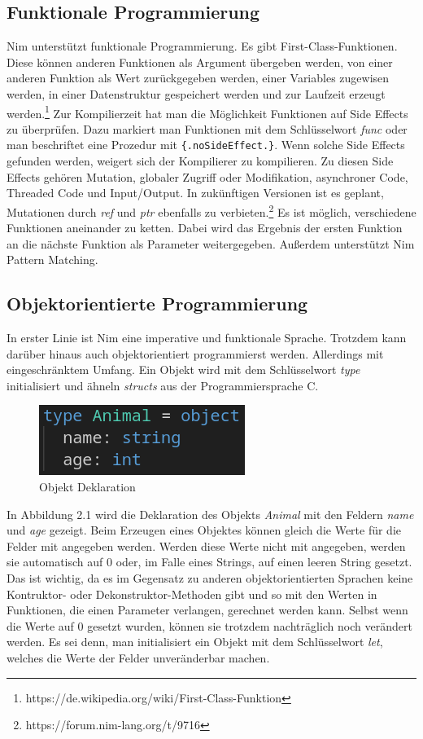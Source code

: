 \documentclass[11pt]{report}
\begin{document}
\subsection{Funktionale Programmierung}
Nim unterstützt funktionale Programmierung. Es gibt First-Class-Funktionen. Diese können anderen Funktionen als Argument übergeben werden, von einer anderen Funktion als Wert zurückgegeben werden, einer Variables zugewisen werden, in einer Datenstruktur gespeichert werden und zur Laufzeit erzeugt werden.\footnote{https://de.wikipedia.org/wiki/First-Class-Funktion}
\newline
Zur Kompilierzeit hat man die Möglichkeit Funktionen auf Side Effects zu überprüfen. Dazu markiert man Funktionen mit dem Schlüsselwort \emph{func} oder man beschriftet eine Prozedur mit \verb|{.noSideEffect.}|. Wenn solche Side Effects gefunden werden, weigert sich der Kompilierer zu kompilieren. Zu diesen Side Effects gehören Mutation, globaler Zugriff oder Modifikation, asynchroner Code, Threaded Code und Input/Output. In zukünftigen Versionen ist es geplant, Mutationen durch \emph{ref} und \emph{ptr} ebenfalls zu verbieten.\footnote{https://forum.nim-lang.org/t/9716}
\newline
Es ist möglich, verschiedene Funktionen aneinander zu ketten. Dabei wird das Ergebnis der ersten Funktion an die nächste Funktion als Parameter weitergegeben.
\newline
Außerdem unterstützt Nim Pattern Matching.

\subsection{Objektorientierte Programmierung}
In erster Linie ist Nim eine imperative und funktionale Sprache. Trotzdem kann darüber hinaus auch objektorientiert programmierst werden. Allerdings mit eingeschränktem Umfang.
Ein Objekt wird mit dem Schlüsselwort \emph{type} initialisiert und ähneln \emph{structs} aus der Programmiersprache C.
\begin{figure}[htp]
\centering
\includegraphics[scale=0.50]{images/image1.png}
\caption{Objekt Deklaration}
\label{}
\end{figure}
In Abbildung 2.1 wird die Deklaration des Objekts \emph{Animal} mit den Feldern \emph{name} und \emph{age} gezeigt. Beim Erzeugen eines Objektes können gleich die Werte für die Felder mit angegeben werden. Werden diese Werte nicht mit angegeben, werden sie automatisch auf 0 oder, im Falle eines Strings, auf einen leeren String gesetzt. Das ist wichtig, da es im Gegensatz zu anderen objektorientierten Sprachen keine Kontruktor- oder Dekonstruktor-Methoden gibt und so mit den Werten in Funktionen, die einen Parameter verlangen, gerechnet werden kann. Selbst wenn die Werte auf 0 gesetzt wurden, können sie trotzdem nachträglich noch verändert werden. Es sei denn, man initialisiert ein Objekt mit dem Schlüsselwort \emph{let}, welches die Werte der Felder unveränderbar machen.
\end{document}
